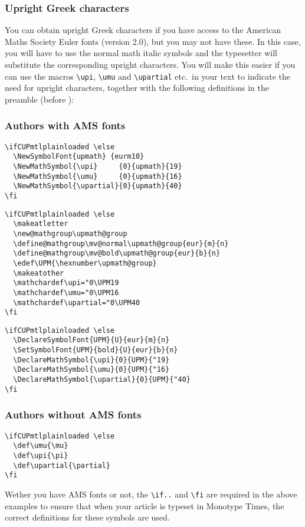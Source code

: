 \subsubsection{Upright Greek characters}\label{upgreek}

You can obtain upright Greek characters if you have access to the
American Maths Society Euler fonts (version 2.0), but you may not
have these. In this case, you will have to use the normal math italic
symbols and the typesetter will substitute the corresponding upright
characters. You will make this easier if you can use the macros \verb|\upi|,
\verb|\umu| and \verb|\upartial| etc.\ in your text to indicate the need for upright characters, together with the following definitions in the preamble
(before \verb||):

\subsubsection*{Authors with AMS fonts}

\ifoldfss
%
\begin{verbatim}
\ifCUPmtlplainloaded \else
  \NewSymbolFont{upmath} {eurm10}
  \NewMathSymbol{\upi}     {0}{upmath}{19}
  \NewMathSymbol{\umu}     {0}{upmath}{16}
  \NewMathSymbol{\upartial}{0}{upmath}{40}
\fi
\end{verbatim}
%
\fi

\ifnfssone
%
\begin{verbatim}
\ifCUPmtlplainloaded \else
  \makeatletter
  \new@mathgroup\upmath@group
  \define@mathgroup\mv@normal\upmath@group{eur}{m}{n}
  \define@mathgroup\mv@bold\upmath@group{eur}{b}{n}
  \edef\UPM{\hexnumber\upmath@group}
  \makeatother
  \mathchardef\upi="0\UPM19
  \mathchardef\umu="0\UPM16
  \mathchardef\upartial="0\UPM40
\fi
\end{verbatim}
%
\fi

\ifnfsstwo
%
\begin{verbatim}
\ifCUPmtlplainloaded \else
  \DeclareSymbolFont{UPM}{U}{eur}{m}{n}
  \SetSymbolFont{UPM}{bold}{U}{eur}{b}{n}
  \DeclareMathSymbol{\upi}{0}{UPM}{"19}
  \DeclareMathSymbol{\umu}{0}{UPM}{"16}
  \DeclareMathSymbol{\upartial}{0}{UPM}{"40}
\fi
\end{verbatim}
%
\fi

\subsubsection*{Authors without AMS fonts}

\begin{verbatim}
\ifCUPmtlplainloaded \else
  \def\umu{\mu}
  \def\upi{\pi}
  \def\upartial{\partial}
\fi
\end{verbatim}
Wether you have AMS fonts or not, the \verb|\if..| and \verb|\fi| are
required in the above examples to ensure that when your article is
typeset in Monotype Times, the correct definitions for these symbols
are used.

